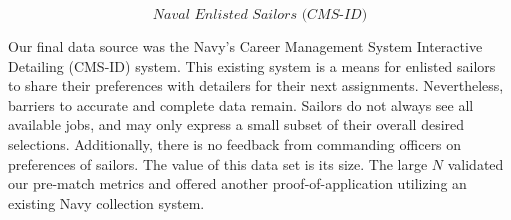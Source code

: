 \[\textit{Naval Enlisted Sailors (CMS-ID)}\]

Our final data source was the Navy’s Career Management System Interactive Detailing (CMS-ID) system. This existing system is a means for enlisted sailors to share their preferences with detailers for their next assignments. Nevertheless, barriers to accurate and complete data remain.  Sailors do not always see all available jobs, and may only express a small subset of their overall desired selections. Additionally, there is no feedback from commanding officers on preferences of sailors. The value of this data set is its size.  The large $N$ validated our pre-match metrics and offered another proof-of-application utilizing an existing Navy collection system.